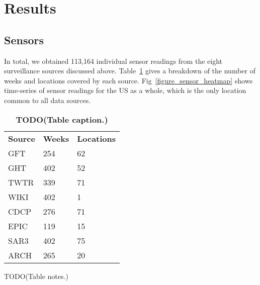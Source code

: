 \documentclass[10pt,letterpaper]{article}
\newlength\savedwidth
\newcommand\thickhline{\noalign{\global\savedwidth\arrayrulewidth\global\arrayrulewidth 2pt}%
\hline
\noalign{\global\arrayrulewidth\savedwidth}}
\begin{document}
\section*{Results}

\subsection*{Sensors}


In total, we obtained 113,164 individual sensor readings from the eight
surveillance sources discussed above. Table~\ref{table_sensor_breakdown} gives
a breakdown of the number of weeks and locations covered by each source.
Fig~\ref{figure_sensor_heatmap} shows time-series of sensor readings for the US
as a whole, which is the only location common to all data sources.

\begin{table}[!ht]
  \centering
  \caption{{\bf TODO(Table caption.)}}
  \begin{tabular}{|l|l|l|}
    \hline
    {\bf Source} & {\bf Weeks} & {\bf Locations}\\ \thickhline
    GFT & 254 & 62 \\ \hline
    GHT & 402 & 52 \\ \hline
    TWTR & 339 & 71 \\ \hline
    WIKI & 402 & 1 \\ \hline
    CDCP & 276 & 71 \\ \hline
    EPIC & 119 & 15 \\ \hline
    SAR3 & 402 & 75 \\ \hline
    ARCH & 265 & 20 \\ \hline
  \end{tabular}
  \begin{flushleft}
    TODO(Table notes.)
  \end{flushleft}
  \label{table_sensor_breakdown}
\end{table}
\end{document}
